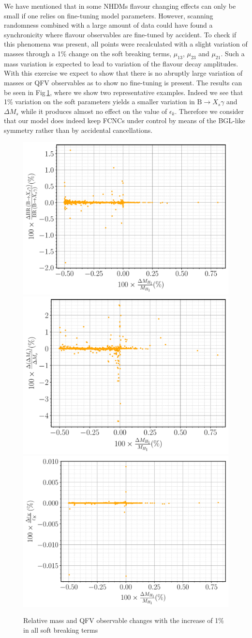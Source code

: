 \documentclass[10pt]{report}
\begin{document}
We have mentioned that in some NHDMs flavour changing effects can only be small if one relies on fine-tuning model parameters. 
%
However, scanning randomness combined with a large amount of data could have found a synchronicity where flavour observables are fine-tuned by accident. 
%
To check if this phenomena was present, all points were recalculated with a slight variation of masses through a 1\% change on the soft breaking terms, $\mu_{13}$, $\mu_{23}$ and $\mu_{21}$. 
%
Such a mass variation is expected to lead to variation of the flavour decay amplitudes. 
%
With this exercise we expect to show that there is no abruptly large variation of masses or QFV observables as to show no fine-tuning is present.
% 
The results can be seen in Fig\,\ref{fig:3HDM_Fine_Tunning}, where we show two representative examples. Indeed we see that 1\% variation on the soft parameters yields a smaller variation in $\textrm{B} \rightarrow X_s \gamma$  and ${\Delta M_s}$ while it produces almost no effect on the value of $\epsilon_k$. Therefore we consider that our model does indeed keep FCNCs under control by means of the BGL-like symmetry rather than by accidental cancellations. 

\begin{figure}[htb!]
\centering
\includegraphics[width=.49\textwidth]{Images/3HDM/Fine_Tuning/Xsgamma_H1.pdf}
\includegraphics[width=.49\textwidth]{Images/3HDM/Fine_Tuning/DeltaMs_H1.pdf}
\includegraphics[width=.49\textwidth]{Images/3HDM/Fine_Tuning/eps_K_H1.pdf}
\caption{Relative mass and QFV observable changes with the increase of 1\% in all soft breaking terms}
\label{fig:3HDM_Fine_Tunning}
\end{figure}	
\end{document}
